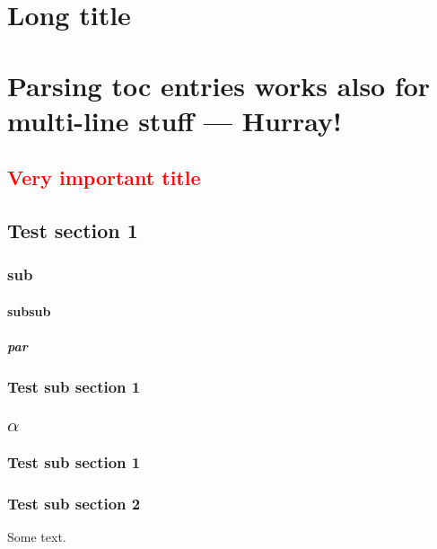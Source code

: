 
\chapter[Short title]{Long title}

\chapter{Parsing {toc entries works
  also for} multi-line \texorpdfstring{stuff}{entries}
--- Hurray!}

\section{\texorpdfstring{\textcolor{red}{Very important title}} {Very important title}}
\label{sec:test2}

\section{Test section 1}

\subsection{sub}

\subsubsection{subsub}

\paragraph{par}

\subsection{Test sub section 1}

\section{$\alpha$}

\subsection{Test sub section 1}

\subsection{Test sub section 2}
Some text.


